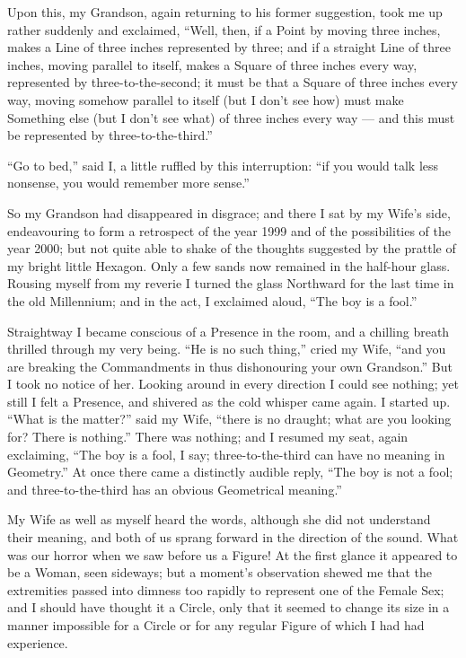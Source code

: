 \documentclass[12pt, a4paper, oneside]{memoir}
\begin{document}
Upon this, my Grandson, again returning to his former suggestion, took me up
rather suddenly and exclaimed, ``Well, then, if a Point by moving three inches,
makes a Line of three inches represented by three; and if a straight Line of
three inches, moving parallel to itself, makes a Square of three inches every
way, represented by three-to-the-second; it must be that a Square of three
inches every way, moving somehow parallel to itself (but I don't see how) must
make Something else (but I don't see what) of three inches every way --- and
this must be represented by three-to-the-third.''

``Go to bed,'' said I, a little ruffled by this interruption: ``if you would talk
less nonsense, you would remember more sense.''

So my Grandson had disappeared in disgrace; and there I sat by my Wife's side,
endeavouring to form a retrospect of the year 1999 and of the possibilities of
the year 2000; but not quite able to shake of the thoughts suggested by the
prattle of my bright little Hexagon. Only a few sands now remained in the
half-hour glass. Rousing myself from my reverie I turned the glass Northward
for the last time in the old Millennium; and in the act, I exclaimed aloud,
``The boy is a fool.''

Straightway I became conscious of a Presence in the room, and a chilling
breath thrilled through my very being. ``He is no such thing,'' cried my Wife,
``and you are breaking the Commandments in thus dishonouring your own
Grandson.'' But I took no notice of her. Looking around in every direction I
could see nothing; yet still I felt a Presence, and shivered as the cold
whisper came again. I started up. ``What is the matter?'' said my Wife, ``there
is no draught; what are you looking for? There is nothing.'' There was nothing;
and I resumed my seat, again exclaiming, ``The boy is a fool, I say;
three-to-the-third can have no meaning in Geometry.'' At once there came a
distinctly audible reply, ``The boy is not a fool; and three-to-the-third has
an obvious Geometrical meaning.''

My Wife as well as myself heard the words, although she did not understand
their meaning, and both of us sprang forward in the direction of the sound.
What was our horror when we saw before us a Figure! At the first glance it
appeared to be a Woman, seen sideways; but a moment's observation shewed me
that the extremities passed into dimness too rapidly to represent one of the
Female Sex; and I should have thought it a Circle, only that it seemed to
change its size in a manner impossible for a Circle or for any regular Figure
of which I had had experience.
\end{document}
